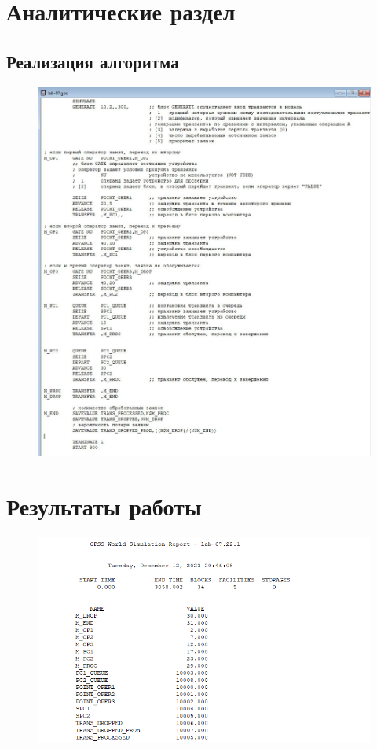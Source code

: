 \section{Аналитические раздел}

\subsection{Реализация алгоритма}

\begin{figure}[ht!]
	\includegraphics[width=1\linewidth]{assets/images/res.jpg}
	\label{fig:r2}
\end{figure}

\section{Результаты работы}


\begin{figure}[ht!]
	\includegraphics[width=0.75\linewidth]{assets/images/res1.png}
	\label{fig:r2}
\end{figure}


